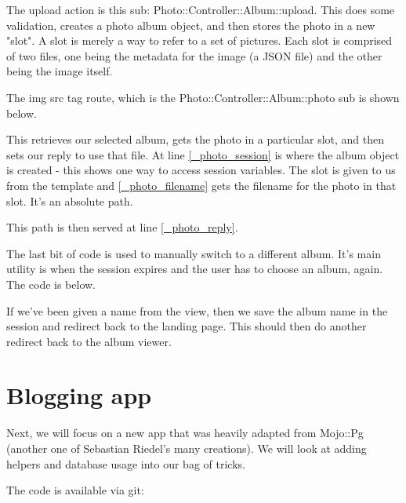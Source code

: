 \documentclass[14pt]{extreport}
\begin{document}


The upload action is this sub: Photo::Controller::Album::upload.  This does
some validation, creates a photo album object, and then stores the photo in a
new "slot".  A slot is merely a way to refer to a set of pictures.  Each slot
is comprised of two files, one being the metadata for the image (a JSON file)
and the other being the image itself.

The img src tag route, which is the Photo::Controller::Album::photo sub is shown below.



This retrieves our selected album, gets the photo in a particular slot, and
then sets our reply to use that file. At line \ref{_photo_session} is where the
album object is created - this shows one way to access session variables. The slot
is given to us from the template and \ref{_photo_filename} gets the filename
for the photo in that slot.  It's an absolute path.

This path is then served at line \ref{_photo_reply}.

The last bit of code is used to manually switch to a different album. It's main utility
is when the session expires and the user has to choose an album, again.  The code is
below.



If we've been given a name from the view, then we save the album name in the session and
redirect back to the landing page.  This should then do another redirect back to the
album viewer.

\section{Blogging app}

Next, we will focus on a new app that was heavily adapted from Mojo::Pg
(another one of Sebastian Riedel's many creations).  We will look at adding
helpers and database usage into our bag of tricks.

The code is available via git:
\end{document}
